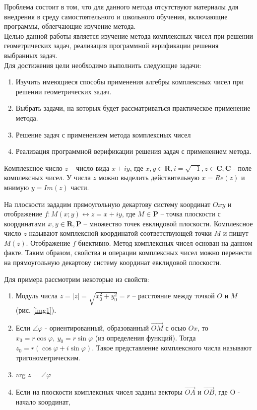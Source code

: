 Проблема состоит в том, что для данного метода отсутствуют материалы для внедрения в среду самостоятельного и школьного обучения, включающие программы, облегчающие изучение метода.\\
Целью данной работы является изучение метода комплексных чисел при решении геометрических задач, реализация программной верификации решения выбранных задач.\\
Для достижения цели необходимо выполнить следующие задачи:
\begin{enumerate}
    \item Изучить имеющиеся способы применения алгебры комплексных чисел при решении геометрических задач.
    \item Выбрать задачи, на которых будет рассматриваться практическое применение метода.
    \item Решение задач с применением метода комплексных чисел
    \item Реализация программной верификации решения задач с применением метода.
\end{enumerate}

Комплексное число \(z\) -- число вида $x + iy$, где $x,y \in \mathbf{R}, i = \sqrt{-1},z \in \mathbf{C}, \mathbf{C}$ - поле комплексных чисел. У числа \(z\) можно выделить действительную $x = Re(z)$ и мнимую $y=Im(z)$ части.

На плоскости зададим прямоугольную декартову систему координат \(Oxy\) и отображение $f: M(x;y) \leftrightarrow z = x + iy$, где $M \in \mathbf{P}$ -- точка плоскости с координатами $x,y \in \mathbf{R}, \mathbf{P}$ -- множество точек евклидовой плоскости. Комплексное число $z$ называют комплексной координатой соответствующей точки $M$ и пишут \(M(z)\).
Отображение \(f\) биективно. Метод комплексных чисел основан на данном факте. Таким образом, свойства и операции комплексных чисел можно перенести на прямоугольную декартову систему координат евклидовой плоскости.

Для примера рассмотрим некоторые из свойств:
\begin{enumerate}
    \item Модуль числа $z = \vert z\vert = \sqrt{x_0^2+y_0^2} = r$ -- расстояние между точкой \(O\) и \(M\) (рис. \ref{img1}).
    \item Если $\angle \varphi$ - ориентированный, образованный $\overrightarrow{OM}$ с осью \(Ox\), то $x_0 = r\cos \varphi,~y_0 = r\sin \varphi$ (из определения функций).
          Тогда $z_0 = r(\cos \varphi + i \sin \varphi)$. Такое представление комплексного числа называют тригонометрическим.
    \item arg $z$ = $\angle \varphi$
    \item Если на плоскости комплексных чисел заданы векторы $\overrightarrow{OA}$ и $\overrightarrow{OB}$, где O - начало координат,
\end{enumerate}

